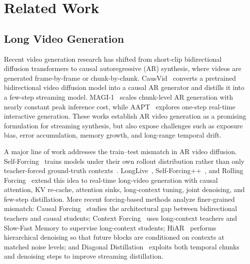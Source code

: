 \appendix
\section{Related Work}
\subsection{Long Video Generation}
Recent video generation research has shifted from short-clip bidirectional diffusion transformers to causal autoregressive (AR) synthesis, where videos are generated frame-by-frame or chunk-by-chunk.
CausVid~\cite{yin2024slow} converts a pretrained bidirectional video diffusion model into a causal AR generator and distills it into a few-step streaming model.
MAGI-1~\cite{sandai2025magi1} scales chunk-level AR generation with nearly constant peak inference cost, while AAPT~\cite{lin2025aapt} explores one-step real-time interactive generation.
These works establish AR video generation as a promising formulation for streaming synthesis, but also expose challenges such as exposure bias, error accumulation, memory growth, and long-range temporal drift.

A major line of work addresses the train--test mismatch in AR video diffusion.
Self-Forcing~\cite{huang2025self} trains models under their own rollout distribution rather than only teacher-forced ground-truth contexts~\cite{zhou2025taming, acdit}.
LongLive~\cite{yang2025longlive}, Self-Forcing++~\cite{cui2025selfforcingminutescalehighqualityvideo}, and Rolling Forcing~\cite{liu2025rolling} extend this idea to real-time long-video generation with causal attention, KV re-cache, attention sinks, long-context tuning, joint denoising, and few-step distillation.
More recent forcing-based methods analyze finer-grained mismatch: Causal Forcing~\cite{zhu2026causal} studies the architectural gap between bidirectional teachers and causal students; Context Forcing~\cite{chen2026context} uses long-context teachers and Slow-Fast Memory to supervise long-context students; HiAR~\cite{zou2026hiar} performs hierarchical denoising so that future blocks are conditioned on contexts at matched noise levels; and Diagonal Distillation~\cite{liu2026diagonal} exploits both temporal chunks and denoising steps to improve streaming distillation.

